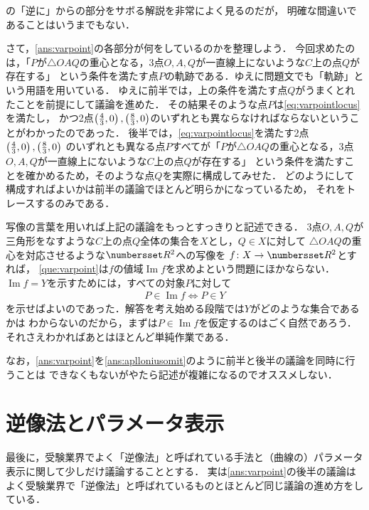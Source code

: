 \documentclass[11pt,a4paper]{ltjsarticle}
\newcommand*{\equivalent}{\Longleftrightarrow}
\newcommand*{\coord}[1]{\paren{#1}}
\DeclareMathOperator{\Image}{Im}
\theoremstyle{definition}
\begin{document}
の「逆に」からの部分をサボる解説を非常によく見るのだが，
明確な間違いであることはいうまでもない．

さて，\cref{ans:varpoint}の各部分が何をしているのかを整理しよう．
今回求めたのは，「$P$が$\triangle OAQ$の重心となる，3点$O,A,Q$が一直線上にないような$C$上の点$Q$が存在する」
という条件を満たす点$P$の軌跡である．ゆえに問題文でも「軌跡」という用語を用いている．
ゆえに前半では，上の条件を満たす点$Q$がうまくとれたことを前提にして議論を進めた．
その結果そのような点$P$は\cref{eq:varpointlocus}を満たし，
かつ2点$\coord{\frac{4}{3}, 0}, \coord{\frac{8}{3}, 0}$のいずれとも異ならなければならないということがわかったのであった．
後半では，\cref{eq:varpointlocus}を満たす2点$\coord{\frac{4}{3}, 0}, \coord{\frac{8}{3}, 0}$
のいずれとも異なる点$P$すべてが「$P$が$\triangle OAQ$の重心となる，3点$O,A,Q$が一直線上にないような$C$上の点$Q$が存在する」
という条件を満たすことを確かめるため，そのような点$Q$を実際に構成してみせた．
どのようにして構成すればよいかは前半の議論でほとんど明らかになっているため，
それをトレースするのみである．

写像の言葉を用いれば上記の議論をもっとすっきりと記述できる．
3点$O,A,Q$が三角形をなすような$C$上の点$Q$全体の集合を$X$とし，$Q \in X$に対して
$\triangle OAQ$の重心を対応させるような$\Real^2$への写像を
$f \colon X \to \Real^2$とすれば，
\cref{que:varpoint}は$f$の値域$\Image f$を求めよという問題にほかならない．
$\Image f = Y$を示すためには，すべての対象$P$に対して
\begin{align}
	P \in \Image f \equivalent P \in Y
	\label{eq:imageiquiv}
\end{align}
を示せばよいのであった．解答を考え始める段階では$Y$がどのような集合であるかは
わからないのだから，まずは$P \in \Image f$を仮定するのはごく自然であろう．
それさえわかればあとはほとんど単純作業である．

なお，\cref{ans:varpoint}を\cref{ans:aplloniusomit}のように前半と後半の議論を同時に行うことは
できなくもないがやたら記述が複雑になるのでオススメしない．



\section{逆像法とパラメータ表示}

最後に，受験業界でよく「逆像法」と呼ばれている手法と（曲線の）パラメータ表示に関して少しだけ議論することとする．
実は\cref{ans:varpoint}の後半の議論は
よく受験業界で「逆像法」と呼ばれているものとほとんど同じ議論の進め方をしている．
\end{document}
